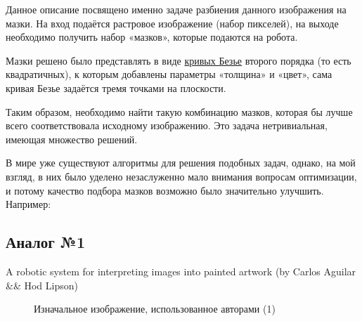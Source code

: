 \documentclass[11pt]{article}
\begin{document}
    Данное описание посвящено именно задаче разбиения данного изображения на мазки.
    На вход подаётся растровое изображение (набор пикселей),
    на выходе необходимо получить набор «мазков», которые подаются на робота.

    Мазки решено было представлять в виде \href{https://en.wikipedia.org/wiki/B\%C3\%A9zier_curve}{кривых Безье}
    второго порядка (то есть квадратичных),
    к которым добавлены параметры «толщина» и «цвет», сама кривая Безье задаётся тремя точками на плоскости.

    Таким образом, необходимо найти такую комбинацию мазков, которая бы лучше всего соответствовала исходному изображению.
    Это задача нетривиальная, имеющая множество решений.

    В мире уже существуют алгоритмы для решения подобных задач, однако, на мой взгляд,
    в них было уделено незаслуженно мало внимания вопросам оптимизации,
    и потому качество подбора мазков возможно было значительно улучшить.
    Например:

%
%
%

    \subsection{Аналог №1}\label{subsec:analog-1}
    A robotic system for interpreting images into painted artwork (by Carlos Aguilar \&\& Hod Lipson)

    \begin{figure}[h!]
        \centering
        \caption{Изначальное изображение, использованное авторами (1)}
        \label{fig:initial_hod}
    \end{figure}
\end{document}
